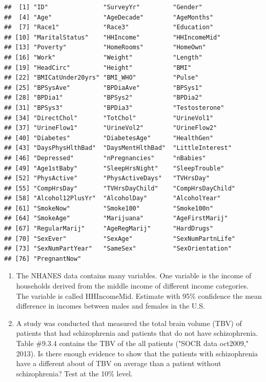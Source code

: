 \documentclass[]{book}
\begin{document}
\begin{verbatim}
##  [1] "ID"               "SurveyYr"         "Gender"          
##  [4] "Age"              "AgeDecade"        "AgeMonths"       
##  [7] "Race1"            "Race3"            "Education"       
## [10] "MaritalStatus"    "HHIncome"         "HHIncomeMid"     
## [13] "Poverty"          "HomeRooms"        "HomeOwn"         
## [16] "Work"             "Weight"           "Length"          
## [19] "HeadCirc"         "Height"           "BMI"             
## [22] "BMICatUnder20yrs" "BMI_WHO"          "Pulse"           
## [25] "BPSysAve"         "BPDiaAve"         "BPSys1"          
## [28] "BPDia1"           "BPSys2"           "BPDia2"          
## [31] "BPSys3"           "BPDia3"           "Testosterone"    
## [34] "DirectChol"       "TotChol"          "UrineVol1"       
## [37] "UrineFlow1"       "UrineVol2"        "UrineFlow2"      
## [40] "Diabetes"         "DiabetesAge"      "HealthGen"       
## [43] "DaysPhysHlthBad"  "DaysMentHlthBad"  "LittleInterest"  
## [46] "Depressed"        "nPregnancies"     "nBabies"         
## [49] "Age1stBaby"       "SleepHrsNight"    "SleepTrouble"    
## [52] "PhysActive"       "PhysActiveDays"   "TVHrsDay"        
## [55] "CompHrsDay"       "TVHrsDayChild"    "CompHrsDayChild" 
## [58] "Alcohol12PlusYr"  "AlcoholDay"       "AlcoholYear"     
## [61] "SmokeNow"         "Smoke100"         "Smoke100n"       
## [64] "SmokeAge"         "Marijuana"        "AgeFirstMarij"   
## [67] "RegularMarij"     "AgeRegMarij"      "HardDrugs"       
## [70] "SexEver"          "SexAge"           "SexNumPartnLife" 
## [73] "SexNumPartYear"   "SameSex"          "SexOrientation"  
## [76] "PregnantNow"
\end{verbatim}

\begin{enumerate}
\def\labelenumi{\arabic{enumi}.}
\setcounter{enumi}{1}
\item
  The NHANES data contains many variables. One variable is the income of households derived from the middle income of different income categories. The variable is called HHIncomeMid. Estimate with 95\% confidence the mean difference in incomes between males and females in the U.S.
\item
  A study was conducted that measured the total brain volume (TBV) of patients that had schizophrenia and patients that do not have schizophrenia. Table \#9.3.4 contains the TBV of the all patients ("SOCR data oct2009," 2013). Is there enough evidence to show that the patients with schizophrenia have a different about of TBV on average than a patient without schizophrenia? Test at the 10\% level.
\end{enumerate}
\end{document}
